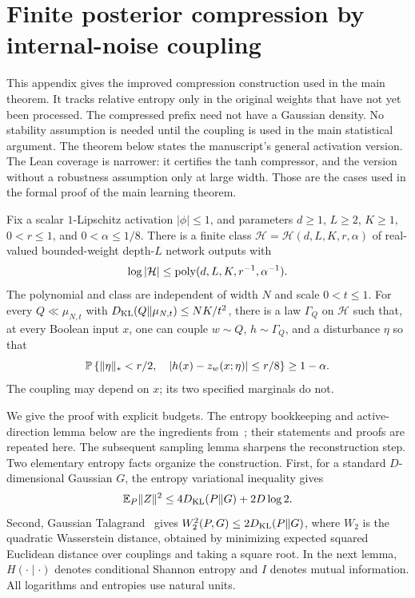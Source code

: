 \section{Finite posterior compression by internal-noise coupling}
\label{sec:robust-entropy}

This appendix gives the improved compression construction used in the main theorem.
It tracks relative entropy only in the original weights that have not yet
been processed. The compressed prefix need not have a Gaussian density.
No stability assumption is needed until the coupling is used in the main
statistical argument.
The theorem below states the manuscript's general activation version.
The Lean coverage is narrower: it certifies the tanh compressor, and the
version without a robustness assumption only at large width. Those are
the cases used in the formal proof of the main learning theorem.

\begin{theorem}
\label{thm:robust-entropy}
Fix a scalar $1$-Lipschitz activation $|\phi|\le1$, and parameters
$d\ge1$, $L\ge2$, $K\ge1$, $0<r\le1$, and $0<\alpha\le1/8$.
There is a finite class $\mathcal H=\mathcal H(d,L,K,r,\alpha)$ of
real-valued bounded-weight depth-$L$ network outputs with
\[
 \log|\mathcal H|\le\operatorname{poly}(d,L,K,r^{-1},\alpha^{-1}).
\]
The polynomial and class are independent of width $N$ and scale $0<t\le1$.
For every $Q\ll\mu_{N,t}$ with
$D_{\rm KL}(Q\Vert\mu_{N,t})\le NK/t^2$, there is a law $\Gamma_Q$ on
$\mathcal H$ such that, at every Boolean input $x$, one can couple
$w\sim Q$, $h\sim\Gamma_Q$, and a disturbance $\eta$ so that
\[
 \mathbb P\left\{\|\eta\|_*<r/2,\quad
       |h(x)-z_w(x;\eta)|\le r/8\right\}\ge1-\alpha.
\]
The coupling may depend on $x$; its two specified marginals do not.
\end{theorem}

We give the proof with explicit budgets. The entropy bookkeeping and
active-direction lemma below are the ingredients from~\cite{earlier};
their statements and proofs are repeated here. The subsequent sampling
lemma sharpens the reconstruction step.
Two elementary entropy facts organize the construction. First, for a standard
$D$-dimensional Gaussian $G$, the entropy variational inequality gives
\begin{equation}\label{eq:entropy-moment}
 \mathbb E_P\|Z\|^2\le4D_{\rm KL}(P\Vert G)+2D\log2.
\end{equation}
Second, Gaussian Talagrand~\cite{talagrand} gives
$W_2^2(P,G)\le2D_{\rm KL}(P\Vert G)$, where $W_2$ is the quadratic
Wasserstein distance, obtained by minimizing expected squared Euclidean
distance over couplings and taking a square root.
In the next lemma, $H(\cdot\mid\cdot)$ denotes conditional Shannon
entropy and $I$ denotes mutual information. All logarithms and entropies
use natural units.

